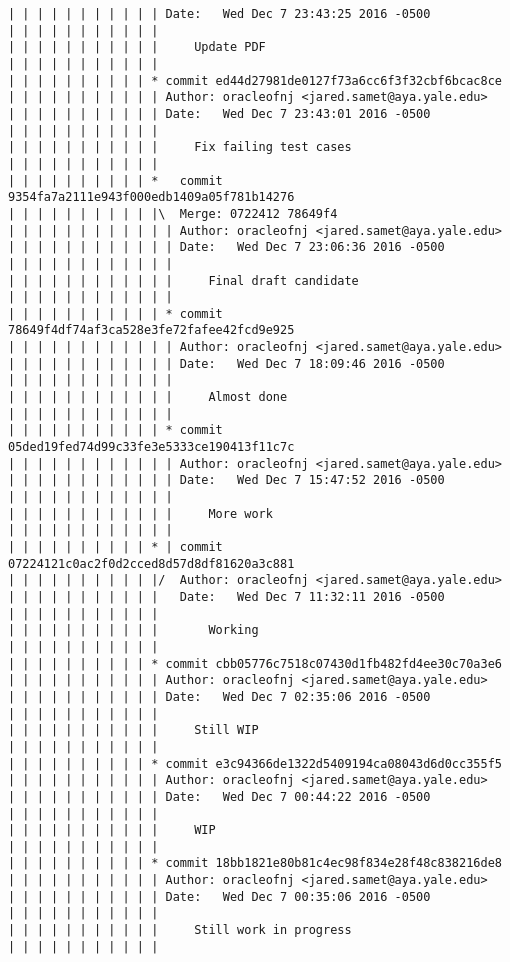 \begin{lstlisting}
| | | | | | | | | | | Date:   Wed Dec 7 23:43:25 2016 -0500
| | | | | | | | | | | 
| | | | | | | | | | |     Update PDF
| | | | | | | | | | |            
| | | | | | | | | | * commit ed44d27981de0127f73a6cc6f3f32cbf6bcac8ce
| | | | | | | | | | | Author: oracleofnj <jared.samet@aya.yale.edu>
| | | | | | | | | | | Date:   Wed Dec 7 23:43:01 2016 -0500
| | | | | | | | | | | 
| | | | | | | | | | |     Fix failing test cases
| | | | | | | | | | |              
| | | | | | | | | | *   commit 9354fa7a2111e943f000edb1409a05f781b14276
| | | | | | | | | | |\  Merge: 0722412 78649f4
| | | | | | | | | | | | Author: oracleofnj <jared.samet@aya.yale.edu>
| | | | | | | | | | | | Date:   Wed Dec 7 23:06:36 2016 -0500
| | | | | | | | | | | | 
| | | | | | | | | | | |     Final draft candidate
| | | | | | | | | | | |             
| | | | | | | | | | | * commit 78649f4df74af3ca528e3fe72fafee42fcd9e925
| | | | | | | | | | | | Author: oracleofnj <jared.samet@aya.yale.edu>
| | | | | | | | | | | | Date:   Wed Dec 7 18:09:46 2016 -0500
| | | | | | | | | | | | 
| | | | | | | | | | | |     Almost done
| | | | | | | | | | | |             
| | | | | | | | | | | * commit 05ded19fed74d99c33fe3e5333ce190413f11c7c
| | | | | | | | | | | | Author: oracleofnj <jared.samet@aya.yale.edu>
| | | | | | | | | | | | Date:   Wed Dec 7 15:47:52 2016 -0500
| | | | | | | | | | | | 
| | | | | | | | | | | |     More work
| | | | | | | | | | | |             
| | | | | | | | | | * | commit 07224121c0ac2f0d2cced8d57d8df81620a3c881
| | | | | | | | | | |/  Author: oracleofnj <jared.samet@aya.yale.edu>
| | | | | | | | | | |   Date:   Wed Dec 7 11:32:11 2016 -0500
| | | | | | | | | | |   
| | | | | | | | | | |       Working
| | | | | | | | | | |            
| | | | | | | | | | * commit cbb05776c7518c07430d1fb482fd4ee30c70a3e6
| | | | | | | | | | | Author: oracleofnj <jared.samet@aya.yale.edu>
| | | | | | | | | | | Date:   Wed Dec 7 02:35:06 2016 -0500
| | | | | | | | | | | 
| | | | | | | | | | |     Still WIP
| | | | | | | | | | |            
| | | | | | | | | | * commit e3c94366de1322d5409194ca08043d6d0cc355f5
| | | | | | | | | | | Author: oracleofnj <jared.samet@aya.yale.edu>
| | | | | | | | | | | Date:   Wed Dec 7 00:44:22 2016 -0500
| | | | | | | | | | | 
| | | | | | | | | | |     WIP
| | | | | | | | | | |            
| | | | | | | | | | * commit 18bb1821e80b81c4ec98f834e28f48c838216de8
| | | | | | | | | | | Author: oracleofnj <jared.samet@aya.yale.edu>
| | | | | | | | | | | Date:   Wed Dec 7 00:35:06 2016 -0500
| | | | | | | | | | | 
| | | | | | | | | | |     Still work in progress
| | | | | | | | | | |            

\end{lstlisting}
